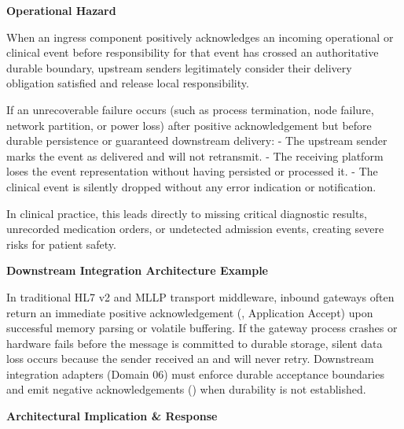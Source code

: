 \par\medskip\textbf{Operational Hazard}\par


When an ingress component positively acknowledges an incoming operational or clinical event before responsibility for that event has crossed an authoritative durable boundary, upstream senders legitimately consider their delivery obligation satisfied and release local responsibility.



If an unrecoverable failure occurs (such as process termination, node failure, network partition, or power loss) after positive acknowledgement but before durable persistence or guaranteed downstream delivery:
- The upstream sender marks the event as delivered and will not retransmit.
- The receiving platform loses the event representation without having persisted or processed it.
- The clinical event is silently dropped without any error indication or notification.



In clinical practice, this leads directly to missing critical diagnostic results, unrecorded medication orders, or undetected admission events, creating severe risks for patient safety.



\par\medskip\textbf{Downstream Integration Architecture Example}\par


In traditional HL7 v2 and MLLP transport middleware, inbound gateways often return an immediate positive acknowledgement (\texttt{}, Application Accept) upon successful memory parsing or volatile buffering. If the gateway process crashes or hardware fails before the message is committed to durable storage, silent data loss occurs because the sender received an \texttt{} and will never retry. Downstream integration adapters (Domain 06) must enforce durable acceptance boundaries and emit negative acknowledgements (\texttt{}) when durability is not established.



\par\medskip\textbf{Architectural Implication \& Response}\par


